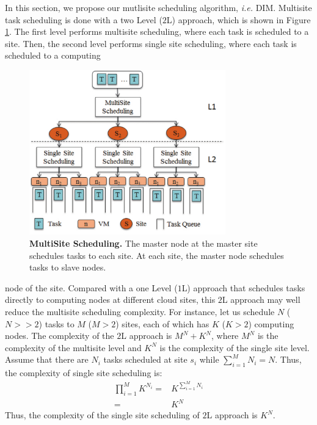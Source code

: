 In this section, we propose our mutlisite scheduling algorithm, \textit{i.e.} DIM.
Multisite task scheduling is done with a two Level ($2$L) approach, which is shown in Figure \ref{fig:MS}. The first level performs multisite scheduling, where each task is scheduled to a site. Then, the second level performs single site scheduling, where each task is scheduled to a computing 
\begin{figure}
\begin{centering}
\captionsetup{justification=centering}
\includegraphics[width=85mm]{figures/MS}
\par\end{centering}
\caption{\textbf{MultiSite Scheduling.} The master node at the master site schedules tasks to each site. At each site, the master node schedules tasks to slave nodes. }
\label{fig:MS}
\end{figure}
\noindent node of the site. 
Compared with a one Level ($1$L) approach that schedules tasks directly to computing nodes at different cloud sites, this $2$L approach may well reduce the multisite scheduling complexity. 
For instance, let us schedule $N$ ($N>>2$) tasks to $M$ ($M>2$) sites, each of which has $K$ ($K>2$) computing nodes. The complexity of the $2$L approach is $M^N + K^N$, where $M^N$ is the complexity of the multisite level and $K^N$ is the complexity of the single site level. Assume that there are $N_i$ tasks scheduled at site $s_i$ while $\sum_{i = 1}^{M}{N_i} = N$. Thus, the complexity of single site scheduling is:
\begin{equation}\label{equ:0}
\begin{split}
\prod_{i = 1}^{M}{K^{N_i}} =& K^{\sum_{i = 1}^{M}{N_i}} \\=& K^N
\end{split}
\end{equation}
Thus, the complexity of the single site scheduling of $2$L approach is $K^N$.
